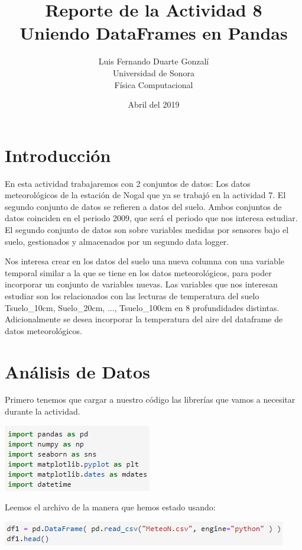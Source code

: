 \documentclass{article}
\title{\textbf{Reporte de la Actividad 8}\\ Uniendo DataFrames en Pandas}
\author{Luis Fernando Duarte Gonzalí \\ Universidad de Sonora \\ Física Computacional}
\date{Abril del 2019}
\begin{document}
\maketitle


\section{Introducción}
En esta actividad trabajaremos con 2 conjuntos de datos: Los datos meteorológicos de la estación de Nogal que ya se trabajó en la actividad 7. El segundo conjunto de datos se refieren a datos del suelo. Ambos conjuntos de datos coinciden en el periodo 2009, que será el periodo que nos interesa estudiar. El segundo conjunto de datos son sobre variables medidas por sensores bajo el suelo, gestionados y almacenados por un segundo data logger. 

Nos interesa crear en los datos del suelo una nueva columna con una variable temporal similar a la que se tiene en los datos meteorológicos, para poder incorporar un conjunto de variables nuevas. Las variables que nos interesan estudiar son los relacionados con las lecturas de temperatura del suelo Tsuelo\_10cm, Suelo\_20cm, ..., Tsuelo\_100cm en 8 profundidades distintas. Adicionalmente se desea incorporar la temperatura del aire del dataframe de datos meteorológicos.

\section{Análisis de Datos}
Primero tenemos que cargar a nuestro código las librerías que vamos a necesitar durante la actividad.
\begin{center}
    \includegraphics[scale = 0.7]{import.png}
\end{center}

Leemos el archivo de la manera que hemos estado usando:

\begin{center}
    \includegraphics[scale = 0.7]{read1.png}
\end{center}
\end{document}
